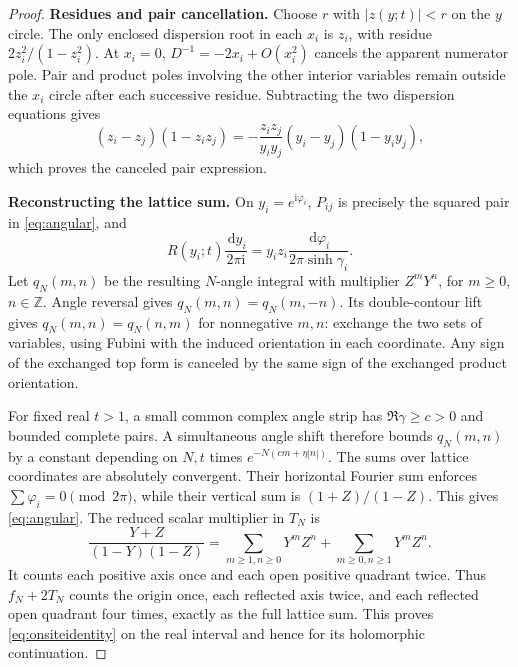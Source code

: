\documentclass[11pt]{article}
\numberwithin{equation}{section}
\theoremstyle{definition}
\newcommand{\dd}{\,\mathrm d}
\newcommand{\ii}{\mathrm i}
\newcommand{\Z}{\mathbb Z}
\begin{document}
\begin{proof}
\noindent\textbf{Residues and pair cancellation.} Choose $r$ with $|z(y;t)|<r$ on the $y$ circle. The only enclosed
dispersion root in each $x_i$ is $z_i$, with residue
$2z_i^2/(1-z_i^2)$. At $x_i=0$, $D^{-1}=-2x_i+O(x_i^2)$ cancels
the apparent numerator pole. Pair and product poles involving the
other interior variables remain outside the $x_i$ circle after each
successive residue. Subtracting the two dispersion equations gives
\[
 (z_i-z_j)(1-z_iz_j)
 =-\frac{z_iz_j}{y_iy_j}(y_i-y_j)(1-y_iy_j),
\]
which proves the canceled pair expression.

\par\smallskip\noindent\textbf{Reconstructing the lattice sum.} On $y_i=e^{\ii\varphi_i}$, $P_{ij}$ is precisely the squared pair
in \eqref{eq:angular}, and
\[
 R(y_i;t)\frac{\dd y_i}{2\pi\ii}
 =y_i z_i\frac{\dd\varphi_i}{2\pi\sinh\gamma_i}.
\]
Let $q_N(m,n)$ be the resulting $N$-angle integral with multiplier
$Z^mY^n$, for $m\ge0$, $n\in\Z$. Angle reversal gives
$q_N(m,n)=q_N(m,-n)$. Its double-contour lift gives
$q_N(m,n)=q_N(n,m)$ for nonnegative $m,n$: exchange the two sets
of variables, using Fubini with the induced orientation in each
coordinate. Any sign of the exchanged top form is canceled by the
same sign of the exchanged product orientation.

For fixed real $t>1$, a small common complex angle strip has
$\Re\gamma\ge c>0$ and bounded complete pairs. A simultaneous
angle shift therefore bounds $q_N(m,n)$ by a constant depending on
$N,t$ times $e^{-N(c m+\eta|n|)}$. The sums over lattice
coordinates are absolutely convergent. Their horizontal Fourier
sum enforces $\sum\varphi_i=0\pmod{2\pi}$, while their vertical
sum is $(1+Z)/(1-Z)$. This gives \eqref{eq:angular}.
The reduced scalar multiplier in $T_N$ is
\[
 \frac{Y+Z}{(1-Y)(1-Z)}
 =\sum_{m\ge1,n\ge0}Y^mZ^n+
   \sum_{m\ge0,n\ge1}Y^mZ^n.
\]
It counts each positive axis once and each open positive quadrant
twice. Thus $f_N+2T_N$ counts the origin once, each reflected axis
twice, and each reflected open quadrant four times, exactly as the
full lattice sum. This proves \eqref{eq:onsiteidentity} on the
real interval and hence for its holomorphic continuation.
\end{proof}
\end{document}
